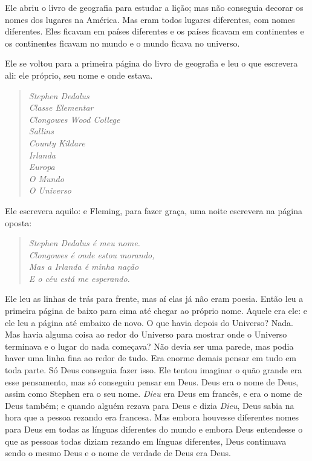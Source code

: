 Ele abriu o livro de geografia para estudar a lição; mas não conseguia
decorar os nomes dos lugares na América. Mas eram todos lugares
diferentes, com nomes diferentes. Eles ficavam em países diferentes e
os países ficavam em continentes e os continentes ficavam no mundo e o
mundo ficava no universo.

Ele se voltou para a primeira página do livro de geografia e leu o que
escrevera ali: ele próprio, seu nome e onde estava.

\begin{verse}\itshape
Stephen Dedalus\\
Classe Elementar\\
Clongowes Wood College\\
Sallins\\
County Kildare\\
Irlanda\\
Europa\\
O Mundo\\
O Universo
\end{verse}

Ele escrevera aquilo: e Fleming, para fazer graça, uma noite escrevera na
página oposta:

\begin{verse}\itshape
Stephen Dedalus é meu nome.\\
Clongowes é onde estou morando,\\
Mas a Irlanda é minha nação\\
E o céu está me esperando.
\end{verse}

Ele leu as linhas de trás para frente, mas aí elas já não eram poesia.
Então leu a primeira página de baixo para cima até chegar ao próprio
nome. Aquele era ele: e ele leu a página até embaixo de novo. O que
havia depois do Universo? Nada. Mas havia alguma coisa ao redor do
Universo para mostrar onde o Universo terminava e o lugar do nada
começava? Não devia ser uma parede, mas podia haver uma linha fina ao
redor de tudo. Era enorme demais pensar em tudo em toda parte. Só Deus
conseguia fazer isso. Ele tentou imaginar o quão grande era esse
pensamento, mas só conseguiu pensar em Deus. Deus era o nome de Deus,
assim como Stephen era o seu nome. \textit{Dieu} era Deus em francês, e
era o nome de Deus também; e quando alguém rezava para Deus e dizia
\textit{Dieu}, Deus sabia na hora que a pessoa rezando era
francesa. Mas embora houvesse diferentes nomes para Deus em todas as
línguas diferentes do mundo e embora Deus entendesse o que as pessoas
todas diziam rezando em línguas diferentes, Deus continuava sendo o
mesmo Deus e o nome de verdade de Deus era Deus.

